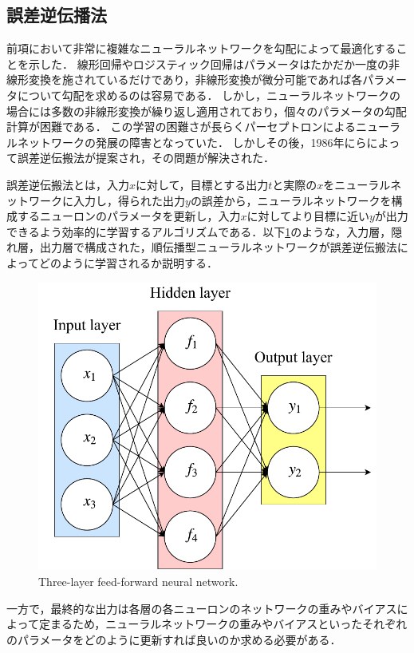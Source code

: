 \subsection{誤差逆伝播法}
    前項において非常に複雑なニューラルネットワークを勾配によって最適化することを示した．
    線形回帰やロジスティック回帰はパラメータはたかだか一度の非線形変換を施されているだけであり，非線形変換が微分可能であれば各パラメータについて勾配を求めるのは容易である．
    しかし，ニューラルネットワークの場合には多数の非線形変換が繰り返し適用されており，個々のパラメータの勾配計算が困難である．
    この学習の困難さが長らくパーセプトロンによるニューラルネットワークの発展の障害となっていた．
    しかしその後，1986年に\cite{rumelhart1986learning}らによって誤差逆伝搬法が提案され，その問題が解決された．

    誤差逆伝搬法とは，入力$x$に対して，目標とする出力$t$と実際の$x$をニューラルネットワークに入力し，得られた出力${y}$の誤差から，ニューラルネットワークを構成するニューロンのパラメータを更新し，入力$x$に対してより目標に近い$y$が出力できるよう効率的に学習するアルゴリズムである．以下\ref{fig:neural_net_with_f}のような，入力層，隠れ層，出力層で構成された，順伝播型ニューラルネットワークが誤差逆伝搬法によってどのように学習されるか説明する．
    \begin{figure}[ht]
        \centering
        \includegraphics[width=12cm]{8_appendix/img/three_layer_nn.pdf}
        \caption{Three-layer feed-forward neural network.}
        \label{fig:neural_net_with_f}
    \end{figure}
    一方で，最終的な出力は各層の各ニューロンのネットワークの重みやバイアスによって定まるため，ニューラルネットワークの重みやバイアスといったそれぞれのパラメータをどのように更新すれば良いのか求める必要がある．
